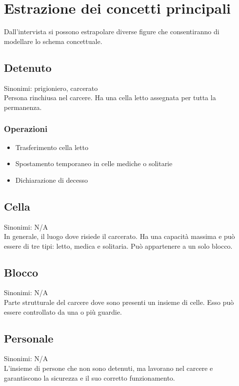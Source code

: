 \documentclass[a4paper,12pt]{report}
\begin{document}
\section{Estrazione dei concetti principali}
Dall'intervista si possono estrapolare diverse figure che consentiranno di modellare lo schema concettuale.
\subsection*{Detenuto}
Sinonimi: prigioniero, carcerato
%
\\Persona rinchiusa nel carcere.
%
Ha una cella letto assegnata per tutta la permanenza.
%
\subsubsection*{Operazioni}
\begin{itemize}
    \item Trasferimento cella letto
    \item Spostamento temporaneo in celle mediche o solitarie
    \item Dichiarazione di decesso
\end{itemize}
\subsection*{Cella}
Sinonimi: N/A
\\In generale, il luogo dove risiede il carcerato.
%
Ha una capacità massima e può essere di tre tipi: letto, medica e solitaria.
%
Può appartenere a un solo blocco.
\subsection*{Blocco}
Sinonimi: N/A
\\Parte strutturale del carcere dove sono presenti un insieme di celle.
%
Esso può essere controllato da una o più guardie.
\subsection*{Personale}
Sinonimi: N/A
\\L'insieme di persone che non sono detenuti, ma lavorano nel carcere e garantiscono la sicurezza e il suo corretto funzionamento.
\end{document}
